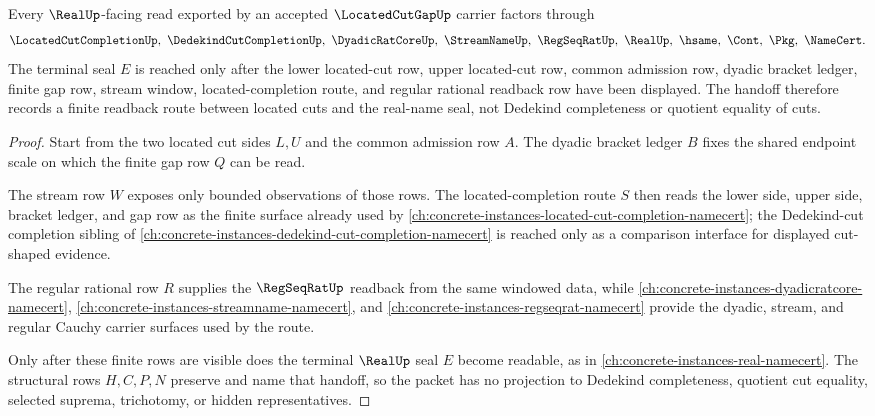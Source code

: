 \begin{theorem}\label{thm:located-cut-gap-real-seal-handoff}
Every $\RealUp$-facing read exported by an accepted $\LocatedCutGapUp$ carrier factors through
$$
\LocatedCutCompletionUp,\ \DedekindCutCompletionUp,\ \DyadicRatCoreUp,\ \StreamNameUp,\ \RegSeqRatUp,\ \RealUp,\ \hsame,\ \Cont,\ \Pkg,\ \NameCert .
$$
The terminal seal $E$ is reached only after the lower located-cut row, upper located-cut row, common admission row, dyadic bracket ledger, finite gap row, stream window, located-completion route, and regular rational readback row have been displayed. The handoff therefore records a finite readback route between located cuts and the real-name seal, not Dedekind completeness or quotient equality of cuts.
\end{theorem}
\begin{proof}
Start from the two located cut sides $L,U$ and the common admission row $A$. The dyadic bracket ledger $B$ fixes the shared endpoint scale on which the finite gap row $Q$ can be read.

The stream row $W$ exposes only bounded observations of those rows. The located-completion route $S$ then reads the lower side, upper side, bracket ledger, and gap row as the finite surface already used by \autoref{ch:concrete-instances-located-cut-completion-namecert}; the Dedekind-cut completion sibling of \autoref{ch:concrete-instances-dedekind-cut-completion-namecert} is reached only as a comparison interface for displayed cut-shaped evidence.

The regular rational row $R$ supplies the $\RegSeqRatUp$ readback from the same windowed data, while \autoref{ch:concrete-instances-dyadicratcore-namecert}, \autoref{ch:concrete-instances-streamname-namecert}, and \autoref{ch:concrete-instances-regseqrat-namecert} provide the dyadic, stream, and regular Cauchy carrier surfaces used by the route.

Only after these finite rows are visible does the terminal $\RealUp$ seal $E$ become readable, as in \autoref{ch:concrete-instances-real-namecert}. The structural rows $H,C,P,N$ preserve and name that handoff, so the packet has no projection to Dedekind completeness, quotient cut equality, selected suprema, trichotomy, or hidden representatives.
\end{proof}



